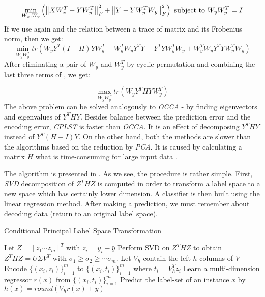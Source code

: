 \begin{equation}\label{eq:cplst5}
    \min_{W_x, W_y} \left(\left\lVert XW_x^T-YW_y^T\right\rVert_{F}^2 + \left\lVert Y-YW_y^TW_y\right\rVert_{F}^2\right)  
    \text{  subject to   } W_yW_y^T=I   
\end{equation}
If we use again  and the relation between a trace of matrix and its Frobenius norm, then we get:
\begin{equation}\label{eq:cplst6}
    \min_{W_yW_y^T} tr(W_yY^T(I-H)YW_y^T-W_y^TW_yY^TY-Y^TYW_y^TW_y+W_y^TW_yY^TYW_y^TW_y)  
\end{equation}
After eliminating a pair of $W_y$ and $W_y^T$ by cyclic permutation and combining the last three terms of , we get:

\begin{equation}\label{eq:cplst6}
    \max_{W_yW_y^T} tr(W_yY^THYW_y^T)  
\end{equation}
The above problem can be solved analogously to \textit{OCCA} - by finding eigenvectors and eigenvalues of $Y^THY$. Besides balance between the prediction error and the encoding error, \textit{CPLST} is faster than \textit{OCCA}. It is an effect of decomposing $Y^THY$ instead of $Y^T(H-I)Y$. On the other hand, both the methods are slower than the algorithms based on the reduction by \textit{PCA}. It is caused by calculating a matrix $H$ what is time-consuming for large input data \cite{ChenLin}.

The algorithm is presented in  \cite{ChenLin}. As we see, the procedure is rather simple. First, \textit{SVD} decomposition of $Z^THZ$  is computed in order to transform a label space to a new space which has certainly lower dimension. A classifier is then built using the linear regression method. After making a prediction, we must remember about decoding data (return to an original label space).  

\begin{algorithm}
    \caption{Conditional Principal Label Space Transformation}\label{alg:cplst1}
    \begin{algorithmic}[1]
        \State Let $Z=[z_1 \cdots z_m]^T$ with $z_i=y_i-\bar{y}$
        \State Perform SVD on $Z^THZ$ to obtain $Z^THZ=U\Sigma V^T$ with $\sigma_{1} \geq \sigma_{2} \geq \cdots \sigma_{m}$. Let $V_h$ contain the left $h$ columns of $V$
        \State Encode $\{(x_i,z_i)\}^{m}_{i=1}$ to $\{(x_i,t_i)\}^{m}_{i=1}$ where $t_i=V^T_hz_i$
        \State Learn a multi-dimension regressor $r(x)$ from $\{(x_i,t_i)\}^{m}_{i=1}$ 
        \State Predict the label-set of an instance $x$ by $h(x)=round(V_hr(x)+\bar{y})$  
    \end{algorithmic}
\end{algorithm}


